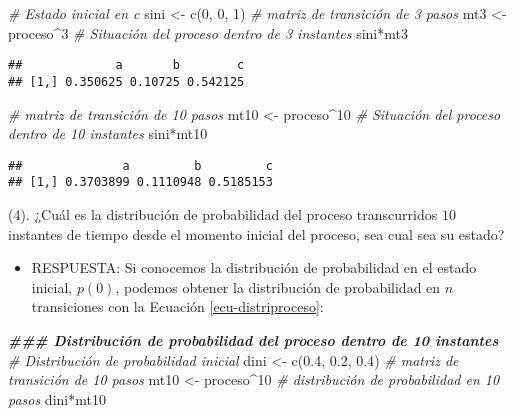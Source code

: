 \documentclass[
]{book}
\newenvironment{Shaded}{\begin{snugshade}}{\end{snugshade}}
\newcommand{\CommentTok}[1]{\textcolor[rgb]{0.56,0.35,0.01}{\textit{#1}}}
\newcommand{\DecValTok}[1]{\textcolor[rgb]{0.00,0.00,0.81}{#1}}
\newcommand{\DocumentationTok}[1]{\textcolor[rgb]{0.56,0.35,0.01}{\textbf{\textit{#1}}}}
\newcommand{\FloatTok}[1]{\textcolor[rgb]{0.00,0.00,0.81}{#1}}
\newcommand{\FunctionTok}[1]{\textcolor[rgb]{0.00,0.00,0.00}{#1}}
\newcommand{\NormalTok}[1]{#1}
\newcommand{\OtherTok}[1]{\textcolor[rgb]{0.56,0.35,0.01}{#1}}
\newcommand{\SpecialCharTok}[1]{\textcolor[rgb]{0.00,0.00,0.00}{#1}}
\providecommand{\tightlist}{%
  \setlength{\itemsep}{0pt}\setlength{\parskip}{0pt}}
\theoremstyle{definition}
\theoremstyle{definition}
\theoremstyle{definition}
\theoremstyle{definition}
\theoremstyle{remark}
\begin{document}
\begin{Shaded}
\begin{Highlighting}[]
\CommentTok{\# Estado inicial en c}
\NormalTok{sini }\OtherTok{\textless{}{-}} \FunctionTok{c}\NormalTok{(}\DecValTok{0}\NormalTok{, }\DecValTok{0}\NormalTok{, }\DecValTok{1}\NormalTok{)}
\CommentTok{\# matriz de transición de 3 pasos}
\NormalTok{mt3 }\OtherTok{\textless{}{-}}\NormalTok{ proceso}\SpecialCharTok{\^{}}\DecValTok{3}
\CommentTok{\# Situación del proceso dentro de 3 instantes}
\NormalTok{sini}\SpecialCharTok{*}\NormalTok{mt3}
\end{Highlighting}
\end{Shaded}

\begin{verbatim}
##             a       b        c
## [1,] 0.350625 0.10725 0.542125
\end{verbatim}

\begin{Shaded}
\begin{Highlighting}[]
\CommentTok{\# matriz de transición de 10 pasos}
\NormalTok{mt10 }\OtherTok{\textless{}{-}}\NormalTok{ proceso}\SpecialCharTok{\^{}}\DecValTok{10}
\CommentTok{\# Situación del proceso dentro de 10 instantes}
\NormalTok{sini}\SpecialCharTok{*}\NormalTok{mt10}
\end{Highlighting}
\end{Shaded}

\begin{verbatim}
##              a         b         c
## [1,] 0.3703899 0.1110948 0.5185153
\end{verbatim}

(4). ¿Cuál es la distribución de probabilidad del proceso transcurridos \(10\) instantes de tiempo desde el momento inicial del proceso, sea cual sea su estado?

\begin{itemize}
\tightlist
\item
  RESPUESTA: Si conocemos la distribución de probabilidad en el estado inicial, \(p(0)\), podemos obtener la distribución de probabilidad en \(n\) transiciones con la Ecuación \ref{ecu-distriproceso}:
\end{itemize}

\begin{Shaded}
\begin{Highlighting}[]
\DocumentationTok{\#\#\# Distribución de probabilidad del proceso dentro de 10 instantes}
\CommentTok{\# Distribución de  probabilidad inicial}
\NormalTok{dini }\OtherTok{\textless{}{-}} \FunctionTok{c}\NormalTok{(}\FloatTok{0.4}\NormalTok{, }\FloatTok{0.2}\NormalTok{, }\FloatTok{0.4}\NormalTok{)}
\CommentTok{\# matriz de transición de 10 pasos}
\NormalTok{mt10 }\OtherTok{\textless{}{-}}\NormalTok{ proceso}\SpecialCharTok{\^{}}\DecValTok{10}
\CommentTok{\# distribución de probabilidad en 10 pasos}
\NormalTok{dini}\SpecialCharTok{*}\NormalTok{mt10}
\end{Highlighting}
\end{Shaded}
\end{document}
